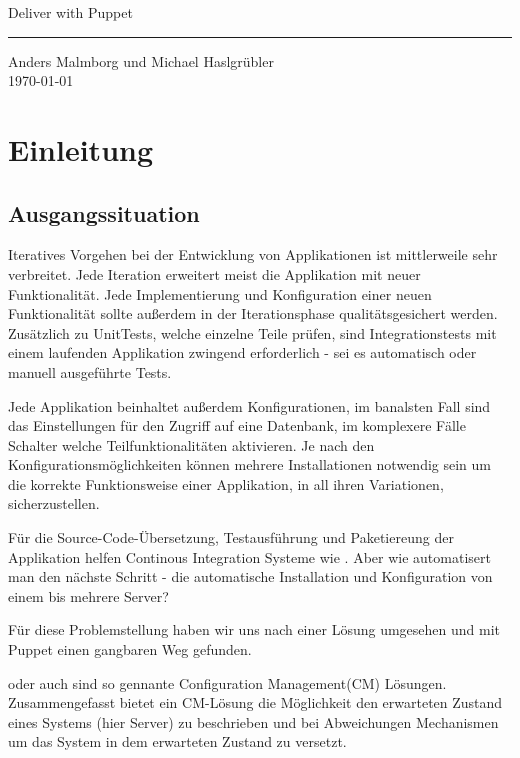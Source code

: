 \documentclass[12pt,a4paper,ngerman]{article}
\begin{document}
 \begin{titlepage}
     \begin{flushright}{\huge Deliver with Puppet}
	\end{flushright}
	\hrule
      
      \begin{flushright}
	  {\large Anders Malmborg und Michael Haslgrübler}\\
	  \today
	\end{flushright}
 \end{titlepage}

\pagestyle{plain}

\section{Einleitung}

\subsection{Ausgangssituation}

Iteratives Vorgehen bei der Entwicklung von Applikationen ist mittlerweile sehr verbreitet. Jede Iteration erweitert meist die Applikation mit neuer Funktionalität. Jede Implementierung und Konfiguration einer neuen Funktionalität sollte außerdem in der Iterationsphase qualitätsgesichert werden. Zusätzlich zu UnitTests, welche einzelne Teile prüfen, sind Integrationstests mit einem laufenden Applikation zwingend erforderlich - sei es automatisch oder manuell ausgeführte Tests.

Jede Applikation beinhaltet außerdem Konfigurationen, im banalsten Fall sind das Einstellungen für den Zugriff auf eine Datenbank, im komplexere Fälle Schalter welche Teilfunktionalitäten aktivieren. Je nach den Konfigurationsmöglichkeiten können mehrere Installationen notwendig sein um die korrekte Funktionsweise einer Applikation, in all ihren Variationen, sicherzustellen.

Für die Source-Code-Übersetzung, Testausführung und Paketiereung der Applikation helfen Continous Integration Systeme wie \cite{jenkins}. Aber wie automatisert man den nächste Schritt - die automatische Installation und Konfiguration von einem bis mehrere Server? 

Für diese Problemstellung haben wir uns nach einer Lösung umgesehen und mit Puppet einen gangbaren Weg gefunden. 

\cite{puppet} oder auch \cite{chef} sind so gennante Configuration Management(CM) Lösungen. Zusammengefasst bietet ein CM-Lösung die Möglichkeit den erwarteten Zustand eines Systems (hier Server) zu beschrieben und bei Abweichungen Mechanismen um das System in dem erwarteten Zustand zu versetzt.
\end{document}

